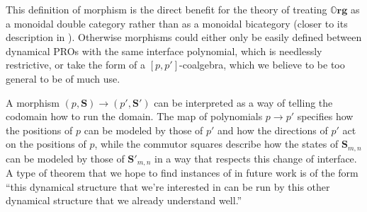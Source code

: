 \documentclass[11pt, one side, article]{memoir}
\theoremstyle{definition}
\theoremstyle{plain}
\newcommand{\Cat}[1]{\mathbf{#1}}%
\newcommand{\0}{\textsf{0}}
\newcommand{\1}{\tn{\textsf{1}}}
\newcommand{\org}{{\mathbb{O}\Cat{rg}}}
\renewcommand{\S}{{\Cat{S}}}
\begin{document}
This definition of morphism is the direct benefit for the theory of treating $\org$ as a monoidal double category rather than as a monoidal bicategory (closer to its description in \cite{spivak2021learners}). Otherwise morphisms could either only be easily defined between dynamical PROs with the same interface polynomial, which is needlessly restrictive, or take the form of a $[p,p']$-coalgebra, which we believe to be too general to be of much use.

A morphism $(p,\S) \to (p',\S')$ can be interpreted as a way of telling the codomain how to run the domain. The map of polynomials $p \to p'$ specifies how the positions of $p$ can be modeled by those of $p'$ and how the directions of $p'$ act on the positions of $p$, while the commutor squares describe how the states of $\S_{m,n}$ can be modeled by those of $\S'_{m,n}$ in a way that respects this change of interface. A type of theorem that we hope to find instances of in future work is of the form ``this dynamical structure that we're interested in can be run by this other dynamical structure that we already understand well.''
\end{document}
